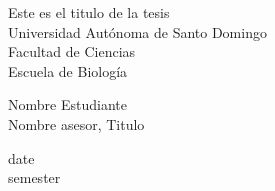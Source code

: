 \begin{titlepage}
\centering
\sffamily

{\huge Este es el titulo de la tesis}\\
{\large Universidad Autónoma de Santo Domingo\\
Facultad de Ciencias\\
Escuela de Biología\\}

Nombre Estudiante\\
Nombre asesor, Titulo

date\\
semester

\end{titlepage}
